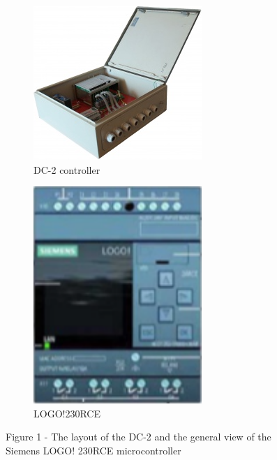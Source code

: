 \begin{figure}[H]
    \centering
    \begin{subfigure}[t]{0.4\textwidth} %
        \centering
        \includegraphics[width=\textwidth]{media/ict/image4}
        \caption*{DC-2 controller}
    \end{subfigure}
    \hspace{0.05\textwidth} %
    \begin{subfigure}[t]{0.4\textwidth} %
        \centering
        \includegraphics[width=0.7\textwidth]{media/ict/image5}
        \caption*{LOGO!230RCE}
    \end{subfigure}
        \caption*{Figure 1 - The layout of the DC-2 and the general view of the
Siemens LOGO! 230RCE microcontroller}
\end{figure}

